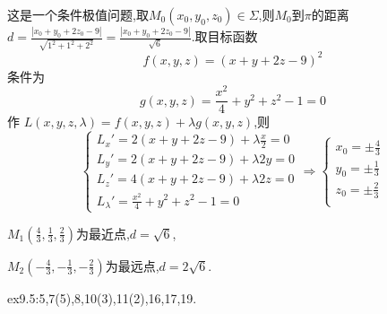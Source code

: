 \begin{solution}
    这是一个条件极值问题,取$M_0(x_0,y_0,z_0) \in \Sigma$,则$M_0$到$\pi$的距离$d = \frac{|x_0 + y_0 + 2z_0 - 9|}{\sqrt{1^2 + 1^2 + 2^2}} = \frac{|x_0 + y_0 + 2z_0 - 9|}{\sqrt{6}}$.取目标函数
    $$
    f(x,y,z) = (x+y+2z-9)^2
    $$
    条件为
$$g(x,y,z) = \frac{x^2}{4} + y^2 + z^2 - 1 = 0$$
作
$L(x,y,z,\lambda) = f(x,y,z) + \lambda g(x,y,z)$,则
$$ \begin{cases}
    L_x' = 2(x+y+2z-9) + \lambda \frac{x}{2} = 0\\
    L_y' = 2(x+y+2z-9) + \lambda 2y = 0\\
    L_z' = 4(x+y+2z-9) + \lambda 2z = 0\\
    L_\lambda' = \frac{x^2}{4} + y^2 + z^2 - 1 = 0
\end{cases} \Rightarrow \begin{cases}
    x_0 = \pm \frac{4}{3}\\
    y_0 = \pm \frac{1}{3}\\
    z_0 = \pm \frac{2}{3}\\
\end{cases}$$

$M_1(\frac{4}{3},\frac{1}{3},\frac{2}{3})$为最近点,$d= \sqrt 6$,

$M_2(-\frac{4}{3},-\frac{1}{3},-\frac{2}{3})$为最远点,$d = 2\sqrt 6 $.
\end{solution}

\begin{homework}
    ex9.5:5,7(5),8,10(3),11(2),16,17,19.
\end{homework}





